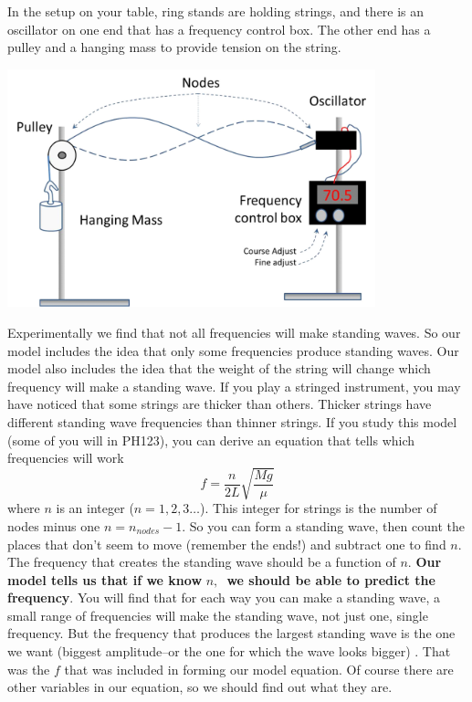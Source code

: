 \documentclass[twoside,11pt,ShortChapTitles]{BYUTextbook}
\begin{document}
In the setup on your table, ring stands are holding strings, and there is an
oscillator on one end that has a frequency control box. The other end has a
pulley and a hanging mass to provide tension on the string.%
\begin{center}
\includegraphics[width=0.8\textwidth]{Lab6_figs/StandingWaveonString.png}
\end{center}

Experimentally we find that not all frequencies will make standing waves. So
our model includes the idea that only some frequencies produce standing waves.
Our model also includes the idea that the weight of the string will change
which frequency will make a standing wave. If you play a stringed instrument,
you may have noticed that some strings are thicker than others. Thicker
strings have different standing wave frequencies than thinner strings. If you
study this model (some of you will in PH123), you can derive an equation that
tells which frequencies will work%
\begin{equation}
f=\frac{n}{2L}\sqrt{\frac{Mg}{\mu}}\label{tolinearize}
\end{equation}
where $n$ is an integer ($n=1,2,3\ldots$). This integer for strings is the
number of nodes minus one $n=n_{nodes}-1$. So you can form a standing wave,
then count the places that don't seem to move (remember the ends!) and
subtract one to find $n.$ The frequency that creates the standing wave should
be a function of $n.$ \textbf{Our model tells us that if we know }%
$n,$\textbf{\ we should be able to predict the frequency}. You will find that
for each way you can make a standing wave, a small range of frequencies will
make the standing wave, not just one, single frequency. But the frequency that
produces the largest standing wave is the one we want (biggest amplitude--or
the one for which the wave looks bigger) . That was the $f$ that was included
in forming our model equation. Of course there are other variables in our
equation, so we should find out what they are.
\end{document}
